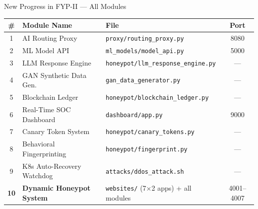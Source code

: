 \documentclass[aspectratio=169,12pt]{beamer}
\begin{document}
\begin{frame}{New Progress in FYP-II --- All Modules}
  \centering\footnotesize
  \begin{tabular}{@{}c l l c@{}}
    \toprule
    \rowcolor{dcMid}
    \textcolor{dcCyan}{\#} & \textcolor{dcCyan}{Module Name} &
    \textcolor{dcCyan}{File} & \textcolor{dcCyan}{Port}\\
    \midrule
    1 & AI Routing Proxy           & \texttt{proxy/routing\_proxy.py}            & 8080\\
    \rowcolor{dcDark}
    2 & ML Model API               & \texttt{ml\_models/model\_api.py}           & 5000\\
    3 & LLM Response Engine        & \texttt{honeypot/llm\_response\_engine.py}  & ---\\
    \rowcolor{dcDark}
    4 & GAN Synthetic Data Gen.    & \texttt{gan\_data\_generator.py}            & ---\\
    5 & Blockchain Ledger          & \texttt{honeypot/blockchain\_ledger.py}     & ---\\
    \rowcolor{dcDark}
    6 & Real-Time SOC Dashboard    & \texttt{dashboard/app.py}                   & 9000\\
    7 & Canary Token System        & \texttt{honeypot/canary\_tokens.py}         & ---\\
    \rowcolor{dcDark}
    8 & Behavioral Fingerprinting  & \texttt{honeypot/fingerprint.py}            & ---\\
    9 & K8s Auto-Recovery Watchdog & \texttt{attacks/ddos\_attack.sh}            & ---\\
    \rowcolor{dcMid}
    \textbf{10} & \textbf{Dynamic Honeypot System} &
    \texttt{websites/} (7$\times$2 apps) + all modules & 4001--4007\\
    \bottomrule
  \end{tabular}
\end{frame}
\end{document}
